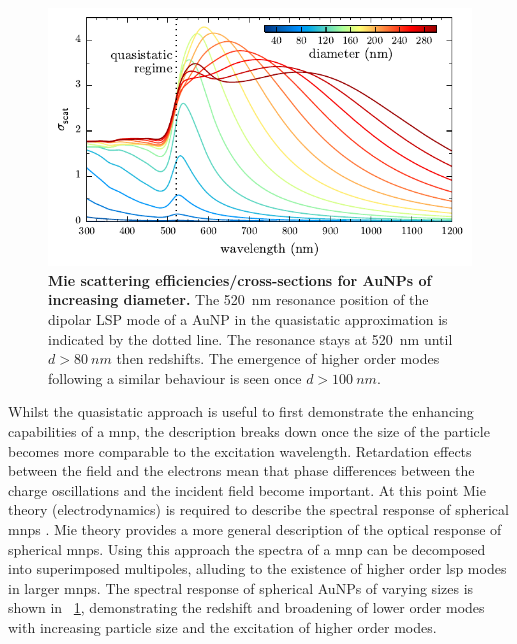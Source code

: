 \documentclass{article}
\begin{document}
\begin{figure}[bt]
\centering
\includegraphics{figures/mie_scattering}
\caption[Mie scattering {\color{red}efficiencies/cross-sections} for AuNPs of increasing diameter]{\textbf{Mie scattering {\color{red}efficiencies/cross-sections} for AuNPs of increasing diameter.} The \SI{520}{nm} resonance position of the dipolar LSP mode of a AuNP in the quasistatic approximation is indicated by the dotted line. The resonance stays at \SI{520}{nm} until $d>\SI{80}{nm}$ then redshifts. The emergence of higher order modes following a similar behaviour is seen once $d>\SI{100}{nm}$.}
\label{fig:mie_scattering}
\end{figure}

Whilst the quasistatic approach is useful to first demonstrate the enhancing capabilities of a \gls{mnp}, the description breaks down once the size of the particle becomes more comparable to the excitation wavelength. Retardation effects between the field and the electrons mean that phase differences between the charge oscillations and the incident field become important. At this point Mie theory (electrodynamics) is required to describe the spectral response of spherical \glspl{mnp} \cite{mie1908}. Mie theory provides a more general description of the optical response of spherical \glspl{mnp}. Using this approach the spectra of a \gls{mnp} can be decomposed into superimposed multipoles, alluding to the existence of higher order \gls{lsp} modes in larger \glspl{mnp}. The spectral response of spherical AuNPs of varying sizes is shown in \figurename~\ref{fig:mie_scattering}, demonstrating the redshift and broadening of lower order modes with increasing particle size and the excitation of higher order modes.
\end{document}
